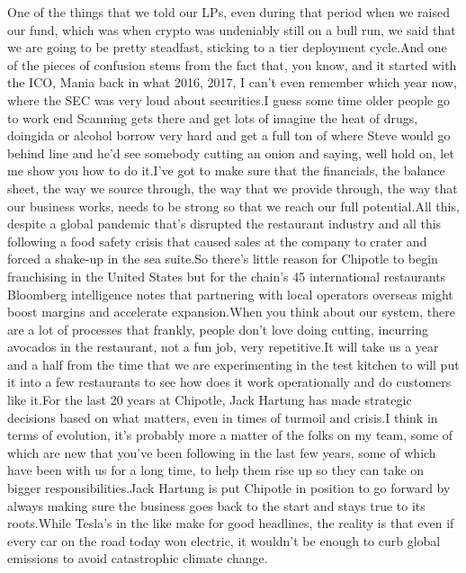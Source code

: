 \documentclass{article}%
\begin{document}
\newline%
One of the things that we told our LPs, even during that period when we raised our fund, which was when crypto was undeniably still on a bull run, we said that we are going to be pretty steadfast, sticking to a tier deployment cycle.And one of the pieces of confusion stems from the fact that, you know, and it started with the ICO, Mania back in what 2016, 2017, I can't even remember which year now, where the SEC was very loud about securities.I guess some time older people go to work end Scanning gets there and get lots of imagine the heat of drugs, doingida or alcohol borrow very hard and get a full ton of where Steve would go behind line and he'd see somebody cutting an onion and saying, well hold on, let me show you how to do it.I've got to make sure that the financials, the balance sheet, the way we source through, the way that we provide through, the way that our business works, needs to be strong so that we reach our full potential.All this, despite a global pandemic that's disrupted the restaurant industry and all this following a food safety crisis that caused sales at the company to crater and forced a shake{-}up in the sea suite.So there's little reason for Chipotle to begin franchising in the United States but for the chain's 45 international restaurants Bloomberg intelligence notes that partnering with local operators overseas might boost margins and accelerate expansion.When you think about our system, there are a lot of processes that frankly, people don't love doing cutting, incurring avocados in the restaurant, not a fun job, very repetitive.It will take us a year and a half from the time that we are experimenting in the test kitchen to will put it into a few restaurants to see how does it work operationally and do customers like it.For the last 20 years at Chipotle, Jack Hartung has made strategic decisions based on what matters, even in times of turmoil and crisis.I think in terms of evolution, it's probably more a matter of the folks on my team, some of which are new that you've been following in the last few years, some of which have been with us for a long time, to help them rise up so they can take on bigger responsibilities.Jack Hartung is put Chipotle in position to go forward by always making sure the business goes back to the start and stays true to its roots.While Tesla's in the like make for good headlines, the reality is that even if every car on the road today won electric, it wouldn't be enough to curb global emissions to avoid catastrophic climate change.%
\end{document}
